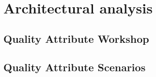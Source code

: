 \documentclass[10pt]{article}
\begin{document}
\section{Architectural analysis}

\subsection{Quality Attribute Workshop}

\subsection{Quality Attribute Scenarios}
\end{document}
